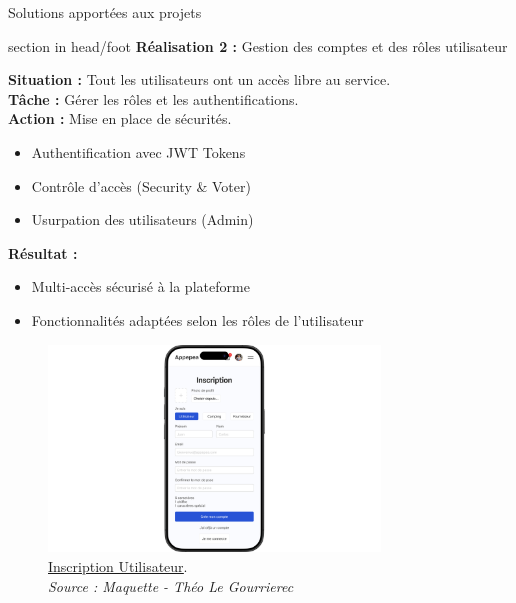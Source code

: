 \documentclass{beamer}
\begin{document}
\begin{frame}{Solutions apportées aux projets}
	\begin{beamercolorbox}[wd=\paperwidth,ht=1.5em,dp=0.5em,leftskip=0.5cm]{section in head/foot}
  		\large \textbf{Réalisation 2 :} \normalsize Gestion des comptes et des rôles utilisateur
	\end{beamercolorbox}
	\vspace{0.5em}
	\begin{center}
		 {
  			\begin{minipage}{0.9\textwidth}
  				\textbf{Situation :} Tout les utilisateurs ont un accès libre au service.\pause \\
  				\textbf{Tâche :} Gérer les rôles et les authentifications.\pause \\
  				\textbf{Action :} Mise en place de sécurités.
  				\begin{itemize}
  					\item Authentification avec JWT Tokens
  					\item Contrôle d'accès (Security \& Voter)
  					\item Usurpation des utilisateurs (Admin)
  					\end{itemize}
  				\pause

				\textbf{Résultat :}
				\begin{itemize}
					\item Multi-accès sécurisé à la plateforme
					\item Fonctionnalités adaptées selon les rôles de l'utilisateur
				\end{itemize}
	  		\end{minipage}
  		}
  		
  		\only<5> {
			\begin{figure}[t]
  				\includegraphics[height=5.5cm]{../img/maquette/inscription.png}
				\caption{	
					\centering			
  					\href{https://github.com/Matteo-K/Soutenance_E-delic/blob/main/img/maquette/inscription.png}{\underline{Inscription Utilisateur}}.\\
  					\textit{Source : Maquette - Théo Le Gourrierec}
				}
  				\label{fig:inscription}
  			\end{figure}
		}
		

\end{center}
\end{frame}
\end{document}
